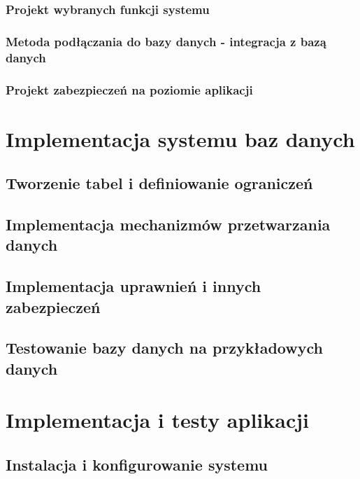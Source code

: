 \documentclass[12pt]{article}
\begin{document}
\subsubsection{Projekt wybranych funkcji systemu}
\subsubsection{Metoda podłączania do bazy danych - integracja z bazą danych}
\subsubsection{Projekt zabezpieczeń na poziomie aplikacji}

\section{Implementacja systemu baz danych}
\subsection{Tworzenie tabel i definiowanie ograniczeń}
\subsection{Implementacja mechanizmów przetwarzania danych}
\subsection{Implementacja uprawnień i innych zabezpieczeń}
\subsection{Testowanie bazy danych na przykładowych danych}


\section{Implementacja i testy aplikacji}
\subsection{Instalacja i konfigurowanie systemu}
\end{document}

